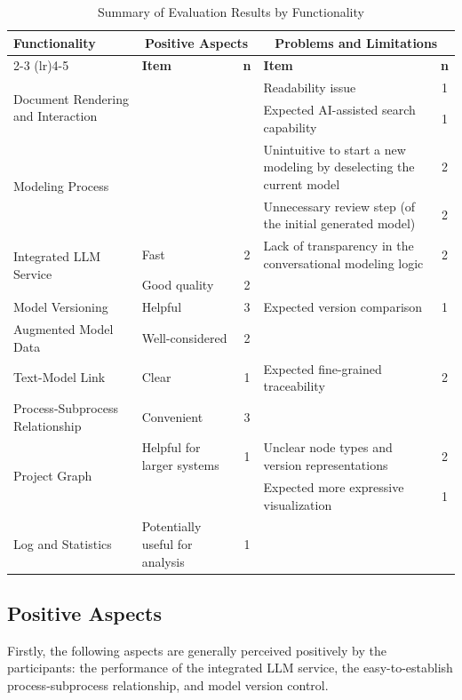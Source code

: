 \begin{table}[htb!]
\centering
\caption{Summary of Evaluation Results by Functionality}
\label{table:evaluation-results}
\begin{tabular}{p{3cm} p{4cm} c p{4.5cm} c}
\toprule
\textbf{Functionality} & \multicolumn{2}{c}{\textbf{Positive Aspects}} & \multicolumn{2}{c}{\textbf{Problems and Limitations}} \\
\cmidrule(lr){2-3} \cmidrule(lr){4-5}
 & \textbf{Item} & \textbf{n} & \textbf{Item} & \textbf{n} \\
\midrule
\multirow{2}{3cm}{Document Rendering and Interaction}
& & & Readability issue  & 1 \\ 
\cmidrule(lr){4-5}
&  &  & Expected AI-assisted search capability & 1\\
\midrule
\multirow{2}{3cm}{Modeling Process}
& & & Unintuitive to start a new modeling by deselecting the current model & 2 \\ 
\cmidrule(lr){4-5}
&  &  & Unnecessary review step (of the initial generated model) & 2\\
\midrule
\multirow{2}{3cm}{Integrated LLM Service}
& Fast & 2 & Lack of transparency in the conversational modeling logic & 2 \\ 
\cmidrule(lr){2-3} 
& Good quality & 2 & & \\
\midrule
Model Versioning
& Helpful & 3 &  Expected version comparison & 1 \\
\midrule
Augmented Model Data
& Well-considered & 2 &  &  \\
\midrule
Text-Model Link & Clear & 1 & Expected fine-grained traceability & 2 \\
\midrule
Process-Subprocess Relationship
& Convenient & 3 &  &  \\
\midrule

\multirow{2}{3cm}{Project Graph}
& Helpful for larger systems & 1 & Unclear node types and version representations & 2 \\
\cmidrule(lr){4-5}
&  &  & Expected more expressive visualization & 1 \\
\midrule

Log and Statistics
& Potentially useful for analysis & 1 &  &  \\
\bottomrule
\end{tabular}
\end{table}

\subsection{Positive Aspects}
Firstly, the following aspects are generally perceived positively by the participants: the performance of the integrated LLM service, the easy-to-establish process-subprocess relationship, and model version control.

